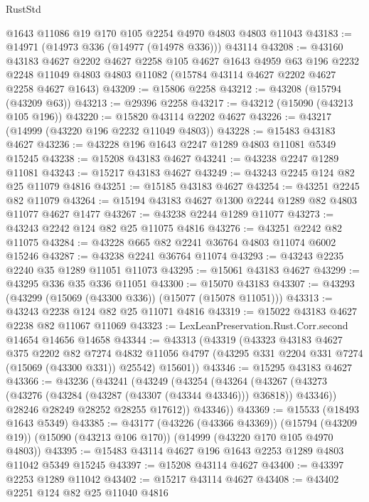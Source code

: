 \begin{lexlean}{RustStd}
\begin{coremodule}
    @1643
    @11086
    @19
    @170
    @105
    @2254
    @4970
    @4803
    @4803
    @11043
@43183 := @14971 (@14973 @336 (@14977 (@14978 @336))) @43114
@43208 := @43160
    @43183
    @4627
    @2202
    @4627
    @2258
    @105
    @4627
    @1643
    @4959
    @63
    @196
    @2232
    @2248
    @11049
    @4803
    @4803
    @11082
    (@15784 @43114 @4627 @2202 @4627 @2258 @4627 @1643)
@43209 := @15806 @2258
@43212 := @43208 (@15794 (@43209 @63))
@43213 := @29396 @2258
@43217 := @43212 (@15090 (@43213 @105 @196))
@43220 := @15820 @43114 @2202 @4627
@43226 := @43217 (@14999 (@43220 @196 @2232 @11049 @4803))
@43228 := @15483 @43183 @4627
@43236 := @43228 @196 @1643 @2247 @1289 @4803 @11081 @5349 @15245
@43238 := @15208 @43183 @4627
@43241 := @43238 @2247 @1289 @11081
@43243 := @15217 @43183 @4627
@43249 := @43243 @2245 @124 @82 @25 @11079 @4816
@43251 := @15185 @43183 @4627
@43254 := @43251 @2245 @82 @11079
@43264 := @15194 @43183 @4627 @1300 @2244 @1289 @82 @4803 @11077 @4627 @1477
@43267 := @43238 @2244 @1289 @11077
@43273 := @43243 @2242 @124 @82 @25 @11075 @4816
@43276 := @43251 @2242 @82 @11075
@43284 := @43228 @665 @82 @2241 @36764 @4803 @11074 @6002 @15246
@43287 := @43238 @2241 @36764 @11074
@43293 := @43243 @2235 @2240 @35 @1289 @11051 @11073
@43295 := @15061 @43183 @4627
@43299 := @43295 @336 @35 @336 @11051
@43300 := @15070 @43183
@43307 := @43293 (@43299 (@15069 (@43300 @336)) (@15077 (@15078 @11051)))
@43313 := @43243 @2238 @124 @82 @25 @11071 @4816
@43319 := @15022 @43183 @4627 @2238 @82 @11067 @11069
@43323 := LexLeanPreservation.Rust.Corr.second @14654 @14656 @14658
@43344 := @43313
    (@43319
      (@43323
        @43183
        @4627
        @375
        @2202
        @82
        @7274
        @4832
        @11056
        @4797
        (@43295 @331 @2204 @331 @7274 (@15069 (@43300 @331)) @25542)
        @15601))
@43346 := @15295 @43183 @4627
@43366 := @43236
    (@43241
      (@43249
        (@43254
          (@43264
            (@43267 (@43273 (@43276 (@43284 (@43287 (@43307 (@43344 @43346))) @36818)) @43346))
            @28246
            @28249
            @28252
            @28255
            @17612))
        @43346))
@43369 := @15533 (@18493 @1643 @5349)
@43385 := @43177
    (@43226 (@43366 @43369))
    (@15794 (@43209 @19))
    (@15090 (@43213 @106 @170))
    (@14999 (@43220 @170 @105 @4970 @4803))
@43395 := @15483 @43114 @4627 @196 @1643 @2253 @1289 @4803 @11042 @5349 @15245
@43397 := @15208 @43114 @4627
@43400 := @43397 @2253 @1289 @11042
@43402 := @15217 @43114 @4627
@43408 := @43402 @2251 @124 @82 @25 @11040 @4816

\end{coremodule}
\end{lexlean}
